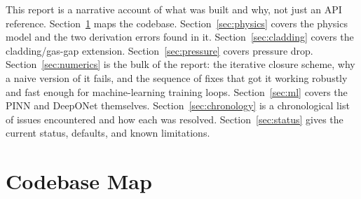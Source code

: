 \documentclass[11pt]{article}
\begin{document}
This report is a narrative account of what was built and why, not just an
API reference. Section~\ref{sec:map} maps the codebase. Section~\ref{sec:physics}
covers the physics model and the two derivation errors found in it.
Section~\ref{sec:cladding} covers the cladding/gas-gap extension.
Section~\ref{sec:pressure} covers pressure drop.
Section~\ref{sec:numerics} is the bulk of the report: the iterative closure
scheme, why a naive version of it fails, and the sequence of fixes that got
it working robustly and fast enough for machine-learning training loops.
Section~\ref{sec:ml} covers the PINN and DeepONet themselves.
Section~\ref{sec:chronology} is a chronological list of issues encountered
and how each was resolved. Section~\ref{sec:status} gives the current
status, defaults, and known limitations.

\section{Codebase Map}
\label{sec:map}
\end{document}
